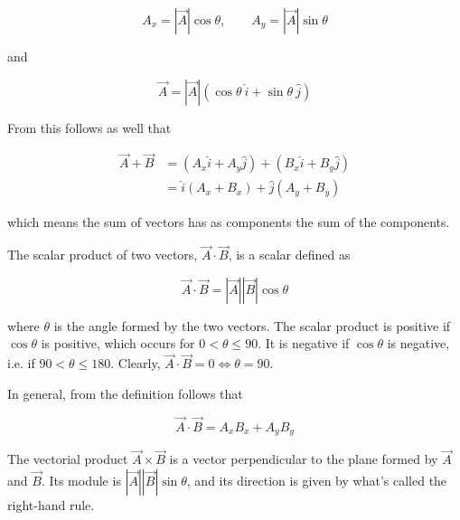 \documentclass[12pt]{article}
\theoremstyle{definition}
\begin{document}
\begin{equation*}
    A_x = \left| \overrightarrow{A} \right|  \cos \theta, \qquad A_y = \left|
    \overrightarrow{A} \right| \sin \theta
\end{equation*}

and 

\begin{equation*}
    \overrightarrow{A} = \left| \overrightarrow{A} \right| \left( \cos \theta
    ~ \hat{i} + \sin \theta ~ \hat{j}\right) 
\end{equation*}

From this follows as well that 

\begin{align*}
    \overrightarrow{A} + \overrightarrow{B} 
    &= \left( A_x \hat{i} + A_y \hat{j} \right) + (B_x \hat{i} + B_y \hat{j}) \\ 
    &= \hat{i}\left( A_x + B_x \right)  + \hat{j}\left( A_y + B_y \right) 
\end{align*}

which means the sum of vectors has as components the sum of the components.

The scalar product of two vectors, $\overrightarrow{A} \cdot
\overrightarrow{B}$, is a scalar defined as 

\begin{equation*}
    \overrightarrow{A} \cdot \overrightarrow{B} = \left| \overrightarrow{A} \right| \left| \overrightarrow{B} \right| \cos \theta
\end{equation*}

where $\theta$ is the angle formed by the two vectors. The scalar product is
positive if $\cos \theta$ is positive, which occurs for $0 < \theta \leq 90$. It
is negative if $\cos \theta $ is negative, i.e. if $90 < \theta \leq 180$.
Clearly, $\overrightarrow{A} \cdot \overrightarrow{B} = 0 \iff \theta = 90$.

In general, from the definition follows that

\begin{equation*}
    \overrightarrow{A} \cdot \overrightarrow{B} = A_x B_x + A_y B_y
\end{equation*}

The vectorial product $\overrightarrow{A} \times \overrightarrow{B}$ is a vector
perpendicular to the plane formed by $\overrightarrow{A}$ and
$\overrightarrow{B}$. Its module is $\left| \overrightarrow{A} \right| \left|
\overrightarrow{B} \right| \sin \theta $, and its direction is given by what's
called the right-hand rule.
\end{document}
